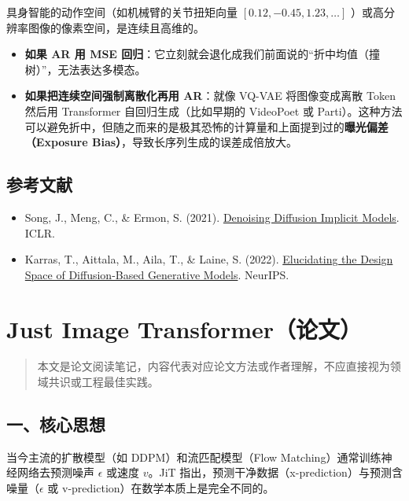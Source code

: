 具身智能的动作空间（如机械臂的关节扭矩向量 \([0.12, -0.45, 1.23, \ldots]\) ）或高分辨率图像的像素空间，是连续且高维的。

\begin{itemize}
\tightlist
\item
  \textbf{如果 AR 用 MSE 回归}：它立刻就会退化成我们前面说的``折中均值（撞树）''，无法表达多模态。
\item
  \textbf{如果把连续空间强制离散化再用 AR}：就像 VQ-VAE 将图像变成离散 Token 然后用 Transformer 自回归生成（比如早期的 VideoPoet 或 Parti）。这种方法可以避免折中，但随之而来的是极其恐怖的计算量和上面提到过的\textbf{曝光偏差（Exposure Bias）}，导致长序列生成的误差成倍放大。
\end{itemize}

\hypertarget{ux53c2ux8003ux6587ux732e-158}{%
\subsection{参考文献}\label{ux53c2ux8003ux6587ux732e-158}}

\begin{itemize}
\tightlist
\item
  Song, J., Meng, C., \& Ermon, S. (2021). \href{https://arxiv.org/abs/2010.02502}{Denoising Diffusion Implicit Models}. ICLR.
\item
  Karras, T., Aittala, M., Aila, T., \& Laine, S. (2022). \href{https://arxiv.org/abs/2206.00364}{Elucidating the Design Space of Diffusion-Based Generative Models}. NeurIPS.
\end{itemize}

\clearpage

\hypertarget{just-image-transformerux8bbaux6587}{%
\section{Just Image Transformer（论文）}\label{just-image-transformerux8bbaux6587}}

\begin{quote}
本文是论文阅读笔记，内容代表对应论文方法或作者理解，不应直接视为领域共识或工程最佳实践。
\end{quote}

\hypertarget{ux4e00ux6838ux5fc3ux601dux60f3-17}{%
\subsection{一、核心思想}\label{ux4e00ux6838ux5fc3ux601dux60f3-17}}

当今主流的扩散模型（如 DDPM）和流匹配模型（Flow Matching）通常训练神经网络去预测噪声 \(\epsilon\) 或速度 \(v\)。JiT 指出，预测干净数据（x-prediction）与预测含噪量（\(\epsilon\) 或 v-prediction）在数学本质上是完全不同的。

